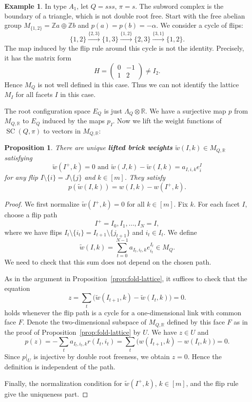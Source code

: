 \documentclass[11pt,a4paper]{article}
\newtheorem{proposition}[theorem]{Proposition}
\theoremstyle{definition}
\newtheorem{example}[theorem]{Example}
\theoremstyle{remark}
\newcommand{\R}{\mathbb R}
\newcommand{\SC}{\operatorname{SC}}
\numberwithin{equation}{section}
\newcommand{\Z}{\mathbb Z}
\newcommand{\wt}{\widetilde}
\begin{document}
\begin{example}
In type $A_1$, let $Q=sss$, $\pi=s$. The subword complex is the boundary of a triangle, which is not double root free.
Start with the free abelian group $M_{\{1,2\}}=\Z a\oplus\Z b$ and
$p(a)=p(b)=-\alpha$. We consider a cycle of flips:
\[
\{1,2\}\overset{\{2,3\}}{\longrightarrow}\{1,3\}\overset{\{1,2\}}{\longrightarrow}\{2,3\}\overset{\{3,1\}}{\longrightarrow}\{1,2\}.
\]
The map induced by the flip rule around this cycle is not the identity. Precisely, it has the matrix form
\[
H=\begin{pmatrix}0&-1\\1&2\end{pmatrix}\neq I_2.
\]
Hence $M_Q$ is not well defined in this case. Thus we can not identify the lattice $M_I$ for all facets $I$ in this case.
\end{example}
The root configuration space $E_Q$ is just $\Lambda_Q\otimes\mathbb{R}$. We have a surjective map $p$ from $M_{Q,\R}$ to $E_Q$ induced by the maps $p_I$. Now we lift the weight functions of $\SC(Q,\pi)$ to vectors in $M_{Q,\R}$:









\begin{proposition}\label{prop:lifted-weights}
There are unique \textbf{lifted brick weights} $\wt w(I,k)\in M_{Q,\R}$ satisfying
\begin{equation}\label{eq:lifted-weight-rule}
\wt w(I^+,k)=0 \text{ and } \wt w(J,k)-\wt w(I,k)=a_{I,i,k}e_i^I
\end{equation}
for any flip $I\setminus\{i\}=J\setminus\{j\}$ and $k\in [m]$. They satisfy
\[
p(\wt w(I,k))=w(I,k)-w(I^+,k).
\]
\end{proposition}

\begin{proof}
We first normalize $\wt w(I^+,k)=0$ for all $k\in [m]$. Fix $k$. For each facet $I$, choose a flip path
\[
I^+=I_0,I_1,\ldots,I_N=I,
\]
where we have flips $I_t\setminus\{i_t\}=I_{t+1}\setminus\{j_{t+1}\}$ and $i_t\in I_t$. We define
\[
\wt w(I,k)
=\sum_{t=0}^{N-1}a_{I_t,i_t,k}e_{i_t}^{I_t}\in M_Q.
\]
We need to check that this sum does not depend on the chosen path.

As in the argument in Proposition~\ref{prop:fold-lattice}, it suffices to check that the equation 
\[
z=\sum_t\bigl(\wt w(I_{t+1},k)-\wt w(I_t,k)\bigr)=0.
\]
holds whenever the flip path is a cycle for a one-dimensional link with common face $F$. Denote the two-dimensional subspace of $M_{Q,\R}$ defined by this face $F$ as in the proof of Proposition~\ref{prop:fold-lattice} by $U$. We have $z\in U$ and
\[
p(z)=-\sum_t a_{I_t,i_t,k}r(I_t,i_t)=\sum_t\bigl(w(I_{t+1},k)-w(I_t,k)\bigr)=0.
\]
Since $p|_{U}$ is injective by double root freeness, we obtain $z=0$. Hence the definition is independent of the path.

Finally, the normalization condition for $\wt w(I^+,k)$, $k\in[m]$, and the flip rule give the uniqueness part.
\end{proof}
\end{document}
